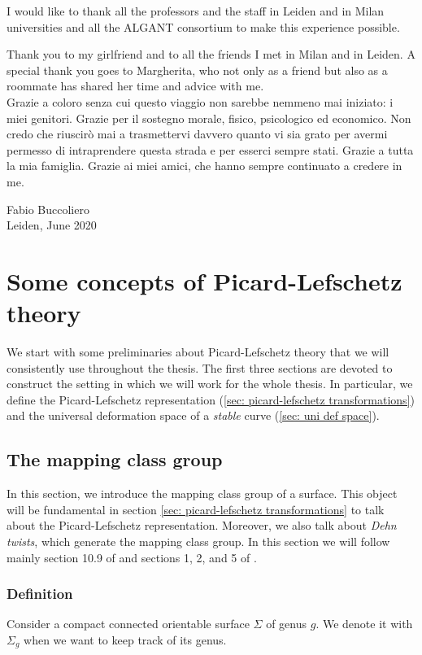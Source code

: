 \documentclass[a4paper,12 pt,titlepage,twoside]{book}
\theoremstyle{plain}
\theoremstyle{theorem}
\theoremstyle{definition}
\theoremstyle{remark}
\begin{document}
I would like to thank all the professors and the staff in Leiden and in Milan universities and all the ALGANT consortium to make this experience possible. 

Thank you to my girlfriend and to all the friends I met in Milan and in Leiden. A special thank you goes to Margherita, who not only as a friend but also as a roommate has shared her time and advice with me.\\

Grazie a coloro senza cui questo viaggio non sarebbe nemmeno mai iniziato: i miei genitori. Grazie per il sostegno morale, fisico, psicologico ed economico. Non credo che riuscirò mai a trasmettervi davvero quanto vi sia grato per avermi permesso di intraprendere questa strada e per esserci sempre stati. Grazie a tutta la mia famiglia. Grazie ai miei amici, che hanno sempre continuato a credere in me.\\
\begin{flushright}
	Fabio Buccoliero \\ Leiden, June 2020
\end{flushright}
\newpage
	
\tableofcontents
\newpage
	
\chapter{Some concepts of Picard-Lefschetz theory}\label{sec: picard-lefschetz theory}
We start with some preliminaries about Picard-Lefschetz theory that we will consistently use throughout the thesis. The first three sections are devoted to construct the setting in which we will work for the whole thesis. In particular, we define the Picard-Lefschetz representation (\ref{sec: picard-lefschetz transformations}) and the universal deformation space of a \emph{stable} curve (\ref{sec: uni def space}).
\section{The mapping class group}
In this section, we introduce the mapping class group of a surface. This object will be fundamental in section \ref{sec: picard-lefschetz transformations} to talk about the Picard-Lefschetz representation. Moreover, we also talk about \emph{Dehn twists}, which generate the mapping class group. In this section we will follow mainly section 10.9 of \cite{MR2807457} and sections 1, 2, and 5 of \cite{massuyea2009short}.
\subsection{Definition}
Consider a compact connected orientable surface $\Sigma$ of genus $g$. We denote it with $\Sigma_g$ when we want to keep track of its genus. 
\end{document}
